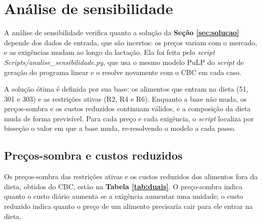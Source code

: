 \documentclass[a4paper,12pt]{article}
\begin{document}
\section{Análise de sensibilidade}\label{sec:sensibilidade}

A análise de sensibilidade verifica quanto a solução da \textbf{Seção \ref{sec:solucao}} depende dos dados de entrada, que são incertos: os preços variam com o mercado, e as exigências mudam ao longo da lactação. Ela foi feita pelo \textit{script Scripts/\allowbreak analise\_\allowbreak sensibilidade.py}, que usa o mesmo modelo PuLP do \textit{script} de geração do programa linear e o resolve novamente com o CBC em cada caso.

A solução ótima é definida por sua base: os alimentos que entram na dieta (51, 301 e 303) e as restrições ativas (R2, R4 e R6). Enquanto a base não muda, os preços-sombra e os custos reduzidos continuam válidos, e a composição da dieta muda de forma previsível. Para cada preço e cada exigência, o \textit{script} localiza por bisseção o valor em que a base muda, re-resolvendo o modelo a cada passo.

\subsection{Preços-sombra e custos reduzidos}

Os preços-sombra das restrições ativas e os custos reduzidos dos alimentos fora da dieta, obtidos do CBC, estão na \textbf{Tabela \ref{tab:duais}}. O preço-sombra indica quanto o custo diário aumenta se a exigência aumentar uma unidade; o custo reduzido indica quanto o preço de um alimento precisaria cair para ele entrar na dieta.
\end{document}
